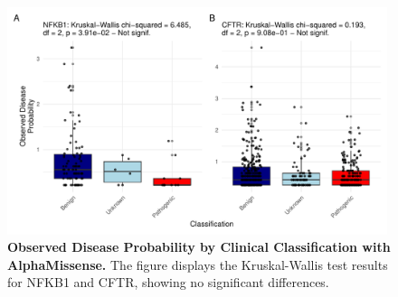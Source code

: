 \begin{figure}[ht]
  \centering
  \includegraphics[width=0.99\textwidth]{../images/p_alphamissense_kw.pdf}
  \caption{\textbf{Observed Disease Probability by Clinical Classification with AlphaMissense.} The figure displays the Kruskal-Wallis test results for NFKB1 and CFTR, showing no significant differences.}
  \label{fig:alphamissense_kw}
\end{figure}

\FloatBarrier





